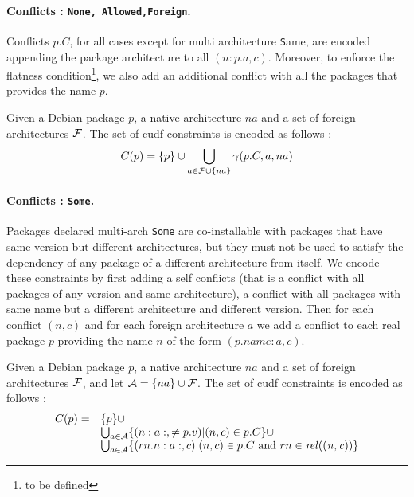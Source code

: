 \paragraph{Conflicts : \texttt{None, Allowed,Foreign}.}
Conflicts $p.C$, for all cases except for multi architecture {\texttt
Same}, are encoded appending the package architecture to all
$(n:p.a,c)$. Moreover, to enforce the flatness condition\footnote{to
be defined}, we also add an additional conflict with all the packages
that provides the name $p$.

\begin{definition}
  Given a Debian package $p$, a native architecture $na$ and a set of
  foreign architectures $\cal{F}$. The set of cudf constraints is
  encoded as follows : 
  \[
    C(p) = \{ p \} \cup \bigcup_{a \in \cal{F} \cup \{ na \} } \gamma(p.C,a,na)
  \]
\end{definition}

\paragraph{Conflicts : \texttt{Some}.}
Packages declared multi-arch \texttt{Some} are co-installable with
packages that have same version but different architectures, but they
must not be used to satisfy the dependency of any package of a
different architecture from itself. We encode these constraints by
first adding a self conflicts (that is a conflict with all packages of
any version and same architecture), a conflict with all packages with
same name but a different architecture and different version. Then for
each conflict $(n,c)$ and for each foreign architecture $a$ we add a
conflict to each real package $p$ providing the name $n$ of the form
$(p.name:a,c)$.

\begin{definition}
  Given a Debian package $p$, a native architecture $na$ and a set of
  foreign architectures $\cal{F}$, and let $\cal{A} = \{ na \}
  \cup \cal{F}$. The set of cudf constraints is encoded as follows : 
  \[
    \begin{array}{rl}
      C(p) = & \{ p \} \cup \\ 
      & \bigcup_{a \in \cal{A}} \{ (n:a:, \neq p.v) | (n,c) \in p.C \} \cup \\
      & \bigcup_{a \in \cal{A}} \{ (\name{rn}:a:,c) | (n,c) \in p.C \mbox{ and } rn \in \rel{(n,c)} \} \\

    \end{array}
  \]
\end{definition}

